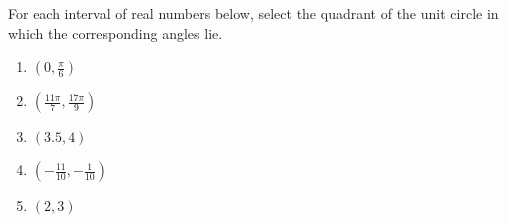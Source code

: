 \documentclass{ximera}
\author{Kenneth Berglund}
\begin{document}
\begin{exercise}
For each interval of real numbers below, select the quadrant of the unit circle in which the corresponding angles lie.

\begin{enumerate}
\item $\left(0, \frac{\pi}{6}\right)$
\begin{multipleChoice}
\end{multipleChoice}

\item $\left(\frac{11\pi}{7}, \frac{17\pi}{9}\right)$
\begin{multipleChoice}
\end{multipleChoice}

\item $\left(3.5, 4\right)$
\begin{multipleChoice}
\end{multipleChoice}

\item $\left(-\frac{11}{10}, -\frac{1}{10}\right)$
\begin{multipleChoice}
\end{multipleChoice}

\item $\left(2, 3\right)$
\begin{multipleChoice}
\end{multipleChoice}


\end{enumerate}
\end{exercise}
\end{document}
